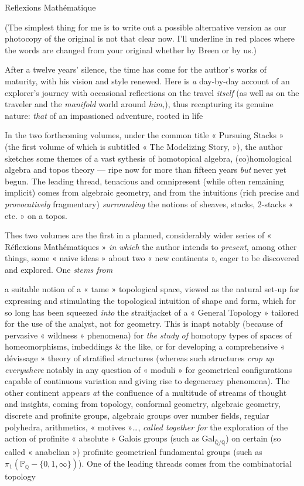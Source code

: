 \documentclass[11pt,a4paper]{article}
\begin{document}
Reflexions Mathématique

(The simplest thing for me is to write
out  a possible alternative
version as our photocopy of the original is not that clear now. I'll
underline in red places where the words are changed from your original
whether by Breen or by us.)

After a twelve years' silence, the time has come for the author's works of
maturity, with his vision and style renewed. Here is \emph{a} day-by-day
account of an explorer's  journey with occasional
reflections on the travel \emph{itself} (as well as on the traveler and
the \emph{manifold} world around \emph{him,}), thus recapturing its genuine nature: \emph{that} of an impassioned
adventure, rooted in life

In the two forthcoming volumes, under the common title « Pursuing
Stacks » (the first volume of which is subtitled « The Modelizing
Story, »), the author sketches some themes of a vast sythesis of
homotopical algebra, (co)homological algebra and topos theory --- ripe now
for more than fifteen years \emph{but} never yet begun. The leading
thread, tenacious and omnipresent (while often remaining implicit) comes
from algebraic geometry, and from the intuitions (rich precise and
\emph{provocatively} fragmentary) \emph{surrounding} the notions of
sheaves, stacks, 2-stacks « etc. » on a topos.

Thes two volumes are the first in a planned, considerably wider
series of « Réflexions Mathématiques » \emph{in which} the author intends
to \emph{present}, among other things, some « naive ideas » about two
« new continents », eager to be discovered and explored. One \emph{stems
from}

a suitable notion of a « tame » topological space, viewed as the natural
set-up for expressing and stimulating the topological intuition of shape
and form, which for so long has been squeezed \emph{into} the
straitjacket of a « General Topology » tailored for the use of the
analyst, not for geometry. This is inapt notably (because of pervasive
« wildness » phenomena) for \emph{the study} \emph{of}
homotopy types of spaces of homeomorphisms, imbeddings \& the like, or for
developing a comprehensive « dévissage » theory of stratified structures
(whereas such structures  \emph{crop up everywhere} notably
in any question of « moduli »  for geometrical configurations
capable of continuous variation and giving rise to degeneracy
phenomena). The other continent appears \emph{at} the confluence of a
multitude of streams of thought and insights, coming from topology,
conformal geometry, algebraic geometry, discrete and profinite groups,
algebraic groups over number fields, regular polyhedra, arithmetics,
« motives »…, \emph{called together for} the exploration of the action
of profinite « absolute » Galois groups (such as
$\mathrm{Gal}_{\bar{\mathbb{Q}}/\mathbb{Q}}$) on certain (so called
« anabelian ») profinite geometrical fundamental groups (such as
$\pi_1(\mathbb{P}_{\bar{\mathbb{Q}}} - \{0,1,\infty\})$). One of the
leading threads comes from the combinatorial topology
\end{document}
